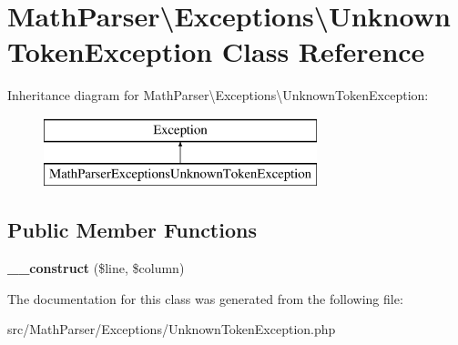 \hypertarget{classMathParser_1_1Exceptions_1_1UnknownTokenException}{\section{Math\-Parser\textbackslash{}Exceptions\textbackslash{}Unknown\-Token\-Exception Class Reference}
\label{classMathParser_1_1Exceptions_1_1UnknownTokenException}
}
Inheritance diagram for Math\-Parser\textbackslash{}Exceptions\textbackslash{}Unknown\-Token\-Exception\-:\begin{figure}[H]
\begin{center}
\leavevmode
\includegraphics[height=2.000000cm]{classMathParser_1_1Exceptions_1_1UnknownTokenException}
\end{center}
\end{figure}
\subsection*{Public Member Functions}
\begin{DoxyCompactItemize}
\item 
\hypertarget{classMathParser_1_1Exceptions_1_1UnknownTokenException_a7a95d30a218e1bafbe69a9daaa7b34ba}{{\bfseries \-\_\-\-\_\-construct} (\$line, \$column)}\label{classMathParser_1_1Exceptions_1_1UnknownTokenException_a7a95d30a218e1bafbe69a9daaa7b34ba}

\end{DoxyCompactItemize}


The documentation for this class was generated from the following file\-:\begin{DoxyCompactItemize}
\item 
src/\-Math\-Parser/\-Exceptions/Unknown\-Token\-Exception.\-php\end{DoxyCompactItemize}
